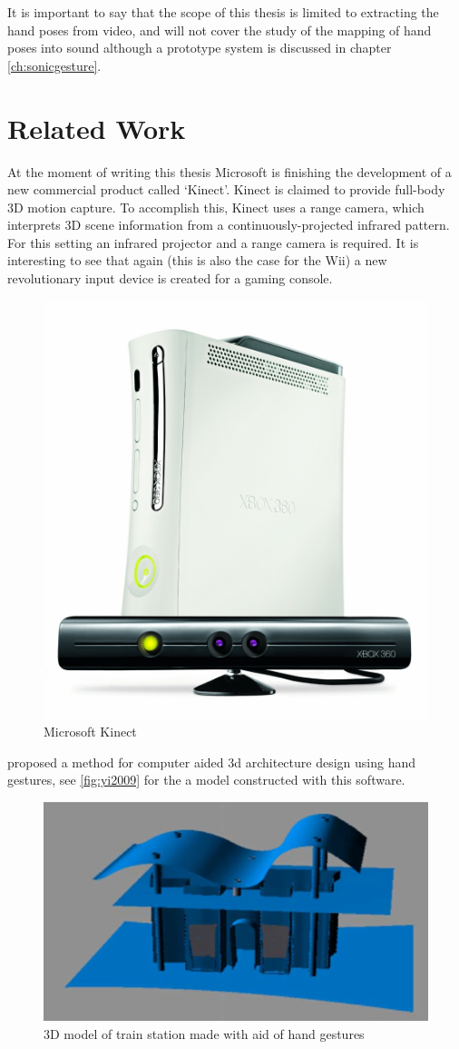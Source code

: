 It is important to say that the scope of this thesis is limited to extracting the hand poses from video, and will not cover the study of the mapping of hand poses into sound although a prototype system is discussed in chapter \autoref{ch:sonicgesture}.


\section{Related Work}
At the moment of writing this thesis Microsoft is finishing the development of a new commercial product called `Kinect'. Kinect is claimed to provide full-body 3D motion capture. To accomplish this, Kinect uses a range camera, which interprets 3D scene information from a continuously-projected infrared pattern. For this setting an infrared projector and a range camera is required. It is interesting to see that again (this is also the case for the Wii) a new revolutionary input device is created for a gaming console. 

\begin{figure}[tb]
	\center{}
	\includegraphics[width=0.3\linewidth]{figures/wave.jpg}
	\caption{Microsoft Kinect}
	\label{fig:kinect}
\end{figure}

\citep{Yi2009} proposed a method for computer aided 3d architecture design using hand gestures, see \autoref{fig:yi2009} for the a model constructed with this software.

\begin{figure}[tb]
	\center{}
	\includegraphics[width=0.6\linewidth]{figures/yi2009.png}
	\caption{3D model of train station made with aid of hand gestures}
	\label{fig:yi2009}
\end{figure}

